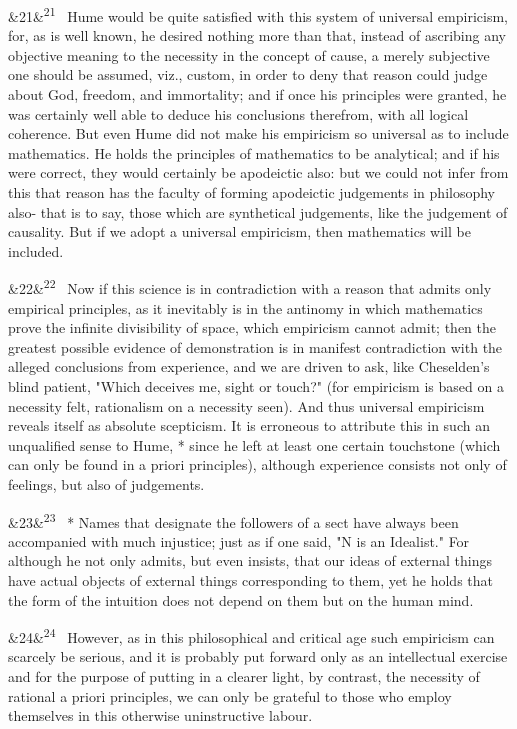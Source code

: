 \documentclass[12pt]{article}
\newcommand{\para}[1][]{\par\noindent\ifx&#1&\else\textsuperscript{\footnotesize #1}~\fi}
\begin{document}
\para[21] Hume would be quite satisfied with this system of universal empiricism, for, as is well known, he desired nothing more than that, instead of ascribing any objective meaning to the necessity in the concept of cause, a merely subjective one should be assumed, viz., custom, in order to deny that reason could judge about God, freedom, and immortality; and if once his principles were granted, he was certainly well able to deduce his conclusions therefrom, with all logical coherence. But even Hume did not make his empiricism so universal as to include mathematics. He holds the principles of mathematics to be analytical; and if his were correct, they would certainly be apodeictic also: but we could not infer from this that reason has the faculty of forming apodeictic judgements in philosophy also- that is to say, those which are synthetical judgements, like the judgement of causality. But if we adopt a universal empiricism, then mathematics will be included.

\para[22] Now if this science is in contradiction with a reason that admits only empirical principles, as it inevitably is in the antinomy in which mathematics prove the infinite divisibility of space, which empiricism cannot admit; then the greatest possible evidence of demonstration is in manifest contradiction with the alleged conclusions from experience, and we are driven to ask, like Cheselden's blind patient, "Which deceives me, sight or touch?" (for empiricism is based on a necessity felt, rationalism on a necessity seen). And thus universal empiricism reveals itself as absolute scepticism. It is erroneous to attribute this in such an unqualified sense to Hume, * since he left at least one certain touchstone (which can only be found in a priori principles), although experience consists not only of feelings, but also of judgements.

\para[23] * Names that designate the followers of a sect have always been accompanied with much injustice; just as if one said, "N is an Idealist." For although he not only admits, but even insists, that our ideas of external things have actual objects of external things corresponding to them, yet he holds that the form of the intuition does not depend on them but on the human mind.

\para[24] However, as in this philosophical and critical age such empiricism can scarcely be serious, and it is probably put forward only as an intellectual exercise and for the purpose of putting in a clearer light, by contrast, the necessity of rational a priori principles, we can only be grateful to those who employ themselves in this otherwise uninstructive labour.
\end{document}
